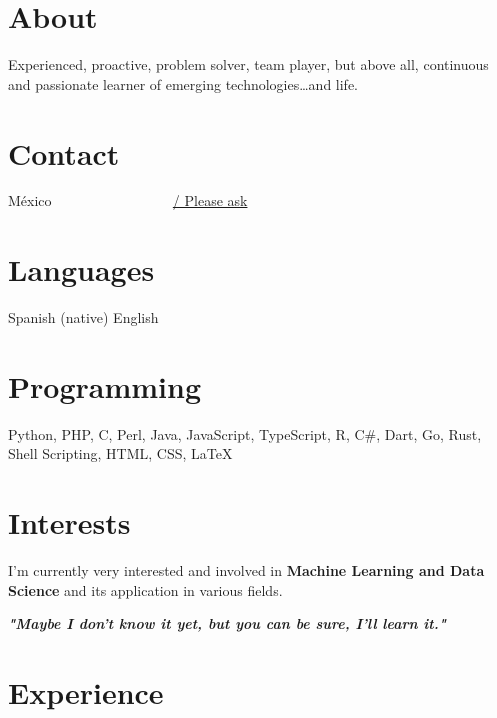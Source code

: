 \documentclass[]{friggeri-cv}
\makeatletter
\newcommand{\phone}[1]{%
  \href{mailto:miguel@gulev.org?subject=We are interested in you!&body=Send us your phone please!}{{\faWhatsapp}/{\faPhoneSquare} #1}
}
\makeatother
\begin{document}

\begin{aside} %
    \section{About}
    Experienced, proactive, problem solver, team player, but above all, continuous and passionate learner of emerging technologies\ldots and life.
    ~
    \section{Contact}
    {\faMapMarker} México
    ~
    ~{\nfURL}
    ~{\nfURL}
    ~{\nfURL}
    ~{\nfURL}
    ~{\nfURL}
    ~{\nfURL}
    ~{\nfURL}
    ~{\nfURL}
    ~{\nfURL}
    \phone{Please ask}~{\nfURL}
    ~
    \section{Languages}
    Spanish (native)
    English
    ~
    \section{Programming}
    Python, PHP, C, Perl, Java, JavaScript, TypeScript, R, C\#, Dart, Go, Rust, Shell Scripting, HTML, CSS, {\LaTeX}
    ~
    \section{Interests}
    I’m currently very interested and involved in \textbf{Machine Learning and Data Science} and its application in various fields.
\end{aside}

\begin{center}
    \large{\textbf{\textit{"Maybe I don't know it yet, but you can be sure, I'll learn it."}}}
\end{center}

\section{Experience}
\end{document}
